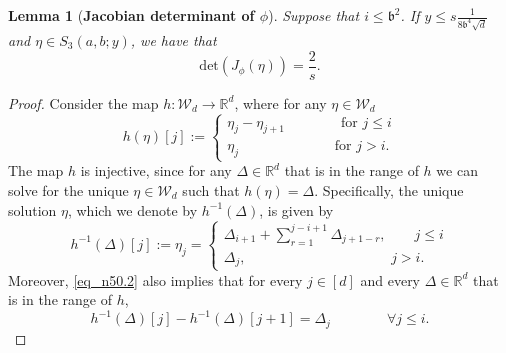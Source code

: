\documentclass[11pt,letterpaper]{article}
\newtheorem{lemma}[theorem]{Lemma}
\begin{document}
\begin{lemma}[\bf Jacobian determinant of $\phi$]\label{prop_Jacobian_phi}
Suppose that  $ i \leq \mathfrak{b}^2$.
%
If  $y \leq s\frac{1}{8\mathfrak{b}^4\sqrt{d} }$ and $\eta \in  S_3(a,b;y)$, we have that
%
$$\mathrm{det}(J_{\phi}(\eta)) = \frac{2}{s}.$$
\end{lemma}
\begin{proof}
%
Consider the map $h: \mathcal{W}_{d} \rightarrow \mathbb{R}^{d}$, where  for any $\eta \in \mathcal{W}_d$
%
\begin{equation}
%
h(\eta)[j] := \begin{cases}
%
\eta_j - \eta_{j+1} \qquad \qquad \textrm{for }j \leq i\\
%
\eta_{j} \qquad \qquad  \qquad \, \, \,  \, \, \textrm{for } j >i.
%
\end{cases}
%
\end{equation}
%
The map $h$ is injective, since for any $\Delta \in \mathbb{R}^d$ that is in the range of $h$ we can solve for the unique $\eta \in \mathcal{W}_d$ such that $h(\eta) = \Delta$.
 Specifically, the unique solution $\eta$, which we denote by $h^{-1}(\Delta)$, is given by 
 \begin{equation}\label{eq_n50.2}
 h^{-1}(\Delta)[j] := \eta_j = \begin{cases}
  \Delta_{i+1} + \sum_{r = 1}^{j - i +1} \Delta_{j+1 - r}, \qquad   j \leq i\\
    \Delta_j, \qquad \qquad \qquad \qquad \qquad \, \,   j > i.
%
 \end{cases}
 \end{equation}
   Moreover,   \eqref{eq_n50.2} also implies that for every $j \in [d]$ and every $\Delta \in \mathbb{R}^d$ that is in the range of $h$,
  \begin{equation}\label{eq_n51.2}
  h^{-1}(\Delta)[j]- h^{-1}(\Delta)[j+1] = \Delta_j \qquad \qquad \forall  j \leq i.
    \end{equation}
    

\end{proof}
\end{document}
